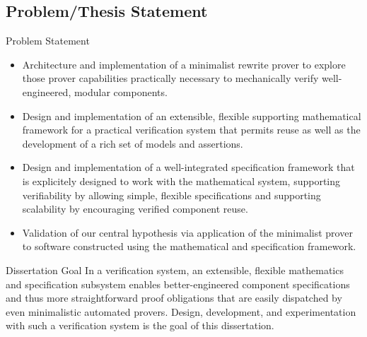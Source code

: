 \documentclass{beamer}
\begin{document}
\subsection{Problem/Thesis Statement}
\begin{frame}{Problem Statement}
	\begin{itemize}
		\item Architecture and implementation of a minimalist rewrite prover to explore those prover capabilities practically necessary to mechanically verify well-engineered, modular components.
		\item Design and implementation of an extensible, flexible supporting mathematical framework for a practical verification system that permits reuse as well as the development of a rich set of models and assertions.
		\item Design and implementation of a well-integrated specification framework that is explicitely designed to work with the mathematical system, supporting verifiability by allowing simple, flexible specifications and supporting scalability by encouraging verified component reuse.
		\item Validation of our central hypothesis via application of the minimalist prover to software constructed using the mathematical and specification framework.
	\end{itemize}
\end{frame}

\begin{frame}{Dissertation Goal}
	In a verification system, an extensible, flexible mathematics and specification subsystem enables better-engineered component specifications and thus more straightforward proof obligations that are easily dispatched by even minimalistic automated provers.  Design, development, and experimentation with such a verification system is the goal of this dissertation.
\end{frame}




\end{document}
